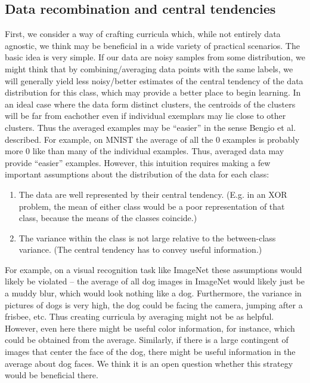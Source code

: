 \documentclass[11pt]{article}
\begin{document}
\subsection{Data recombination and central tendencies}
First, we consider a way of crafting curricula which, while not entirely data agnostic, we think may be beneficial in a wide variety of practical scenarios. The basic idea is very simple. If our data are noisy samples from some distribution, we might think that by combining/averaging data points with the same labels, we will generally yield less noisy/better estimates of the central tendency of the data distribution for this class, which may provide a better place to begin learning. In an ideal case where the data form distinct clusters, the centroids of the clusters will be far from eachother even if individual exemplars may lie close to other clusters. Thus the averaged examples may be ``easier'' in the sense Bengio et al. described. For example, on MNIST the average of all the 0 examples is probably more 0 like than many of the individual examples. Thus, averaged data may provide ``easier'' examples. However, this intuition requires making a few important assumptions about the distribution of the data for each class:
\begin{enumerate}
\item The data are well represented by their central tendency. (E.g. in an XOR problem, the mean of either class would be a poor representation of that class, because the means of the classes coincide.) 
\item The variance within the class is not large relative to the between-class variance. (The central tendency has to convey useful information.) 
\end{enumerate}
For example, on a visual recognition task like ImageNet these assumptions would likely be violated -- the average of all dog images in ImageNet would likely just be a muddy blur, which would look nothing like a dog. Furthermore, the variance in pictures of dogs is very high, the dog could be facing the camera, jumping after a frisbee, etc. Thus creating curricula by averaging might not be as helpful. However, even here there might be useful color information, for instance, which could be obtained from the average. Similarly, if there is a large contingent of images that center the face of the dog, there might be useful information in the average about dog faces. We think it is an open question whether this strategy would be beneficial there. \par
\end{document}
